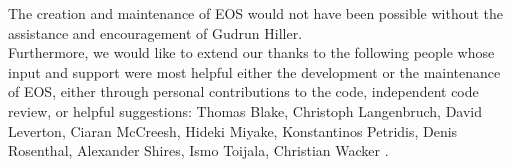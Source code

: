 The creation and maintenance of EOS would not have been possible without
the assistance and encouragement of Gudrun Hiller.\\

Furthermore, we would like to extend our thanks to the following people
whose input and support were most helpful either the development or the
maintenance of EOS, either through personal contributions to the code,
independent code review, or helpful suggestions:
Thomas Blake,
Christoph Langenbruch,
David Leverton,
Ciaran McCreesh,
Hideki Miyake,
Konstantinos Petridis,
Denis Rosenthal,
Alexander Shires,
Ismo Toijala,
Christian Wacker
.
